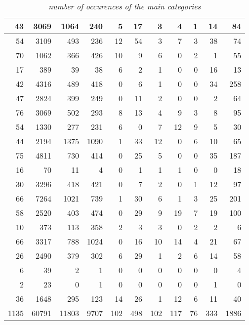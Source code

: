 \begin{table}[hb]
\begin{tabular}{|r|r|r|r|r|r|r|r|r|r|r|%
   }
   \\ \hline
   43  &3069  &1064  &240   &5  &17   &3   &4  &1  &14   &84   %
   \\ \hline
   54  &3109   &493  &236  &12  &54   &3   &7  &3  &38   &74   %
   \\ \hline
   70  &1062   &366  &426  &10   &9   &6   &0  &2   &1   &55   %
   \\ \hline
   17   &389    &39   &38   &6   &2   &1   &0  &0  &16   &13    %
   \\ \hline
   42  &4316   &489  &418   &0   &6   &1   &0  &0  &34  &258   %
   \\ \hline
   47  &2824   &399  &249   &0  &11   &2   &0  &0   &2   &64   %
   \\ \hline
   76  &3069   &502  &293   &8  &13   &4   &9  &3   &8   &95   %
   \\ \hline
   54  &1330   &277  &231   &6   &0   &7  &12  &9   &5   &30   %
   \\ \hline
   44  &2194  &1375 &1090   &1  &33  &12   &0  &6  &10   &65   %
   \\ \hline
   75  &4811   &730  &414   &0  &25   &5   &0  &0  &35  &187   %
   \\ \hline
   16    &70    &11    &4   &0   &1   &1   &1  &0   &0   &18    %
   \\ \hline
   30  &3296   &418  &421   &0   &7   &2   &0  &1  &12   &97   %
   \\ \hline
   66  &7264  &1021  &739   &1  &30   &6   &1  &3  &25  &201   %
   \\ \hline
   58  &2520   &403  &474   &0  &29   &9  &19  &7  &19  &100   %
   \\ \hline
   10   &373   &113  &358   &2   &3   &3   &0  &2   &2    &6    %
   \\ \hline
   66  &3317   &788 &1024   &0  &16  &10  &14  &4  &21   &67   %
   \\ \hline
   26  &2490   &379  &302   &6  &29   &1   &2  &6  &14   &58   %
   \\ \hline
    6    &39     &2    &1   &0   &0   &0   &0  &0   &0    &4     %
   \\ \hline
    2    &23     &0    &1   &0   &0   &0   &0  &0   &1    &0     %
   \\ \hline
   36  &1648   &295  &123  &14  &26   &1  &12  &6  &11   &40   %
   \\ \hline\hline
   1135 &60791 &11803 &9707 &102 &498 &102 &117 &76 &333 &1886  %
   \\ \hline
  \end{tabular}
\caption{{\em number of occurences of the main categories}} 
\end{table}

